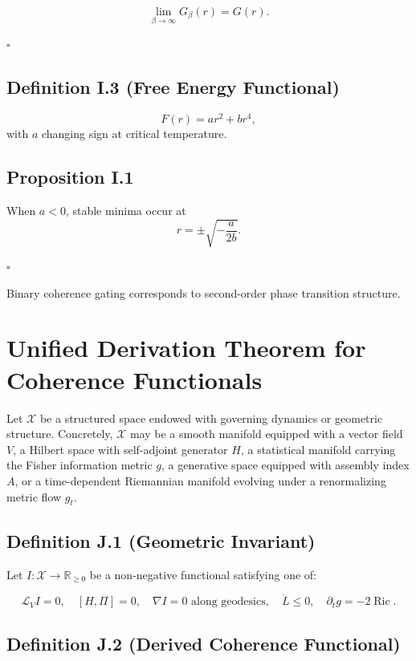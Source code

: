 \documentclass[12pt]{article}
\begin{document}
\[
\lim_{\beta \to \infty} G_\beta(r) = G(r).
\]

\hfill $\square$

\subsection*{Definition I.3 (Free Energy Functional)}

\[
F(r)
=
a r^2 + b r^4,
\]
with $a$ changing sign at critical temperature.

\subsection*{Proposition I.1}

When $a < 0$, stable minima occur at
\[
r = \pm \sqrt{-\frac{a}{2b}}.
\]

\hfill $\square$

Binary coherence gating corresponds to second-order phase transition structure.

\section{Unified Derivation Theorem for Coherence Functionals}

Let $\mathcal{X}$ be a structured space endowed with governing dynamics or geometric structure. Concretely, $\mathcal{X}$ may be a smooth manifold equipped with a vector field $V$, a Hilbert space with self-adjoint generator $H$, a statistical manifold carrying the Fisher information metric $g$, a generative space equipped with assembly index $A$, or a time-dependent Riemannian manifold evolving under a renormalizing metric flow $g_t$.

\subsection*{Definition J.1 (Geometric Invariant)}

Let $I : \mathcal{X} \to \mathbb{R}_{\ge 0}$ be a non-negative functional satisfying one of:

\[
\mathcal{L}_V I = 0,
\quad
[H, \Pi] = 0,
\quad
\nabla I = 0 \text{ along geodesics},
\quad
\dot{L} \le 0,
\quad
\partial_t g = -2\operatorname{Ric}.
\]

\subsection*{Definition J.2 (Derived Coherence Functional)}
\end{document}
